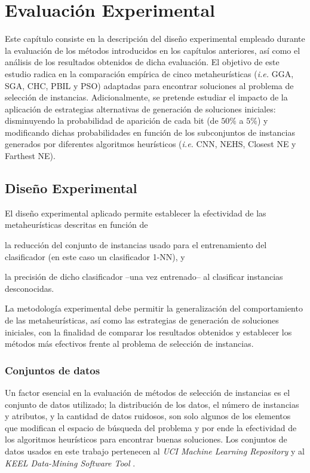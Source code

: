 \chapter{Evaluación Experimental}
\label{capitulo4}

Este capítulo consiste en la descripción del diseño experimental empleado durante la evaluación de los métodos introducidos en los capítulos anteriores, así como el análisis de los resultados obtenidos de dicha evaluación. El objetivo de este estudio radica en la comparación empírica de cinco metaheurísticas (\emph{i.e.} GGA, SGA, CHC, PBIL y PSO) adaptadas para encontrar soluciones al problema de selección de instancias. Adicionalmente, se pretende estudiar el impacto de la aplicación de estrategias alternativas de generación de soluciones iniciales: disminuyendo la probabilidad de aparición de cada bit (de $50\%$ a $5\%$) y modificando dichas probabilidades en función de los subconjuntos de instancias generados por diferentes algoritmos heurísticos (\emph{i.e.} CNN, NEHS, Closest NE y Farthest NE).

\section{Diseño Experimental}

El diseño experimental aplicado permite establecer la efectividad de las metaheurísticas descritas en función de
\begin{inparaenum}
\item la reducción del conjunto de instancias usado para el entrenamiento del clasificador (en este caso un clasificador 1-NN), y
\item la precisión de dicho clasificador --una vez entrenado-- al clasificar instancias desconocidas.
\end{inparaenum}
La metodología experimental debe permitir la generalización del comportamiento de las metaheurísticas, así como las estrategias de generación de soluciones iniciales, con la finalidad de comparar los resultados obtenidos y establecer los métodos más efectivos frente al problema de selección de instancias.

\subsection{Conjuntos de datos}
\label{data-section}

Un factor esencial en la evaluación de métodos de selección de instancias es el conjunto de datos utilizado; la distribución de los datos, el número de instancias y atributos, y la cantidad de datos ruidosos, son solo algunos de los elementos que modifican el espacio de búsqueda del problema y por ende la efectividad de los algoritmos heurísticos para encontrar buenas soluciones. Los conjuntos de datos usados en este trabajo pertenecen al \emph{UCI Machine Learning Repository} \cite{BacheLichman:2013} y al \emph{KEEL Data-Mining Software Tool} \cite{alcala2010keel}.

